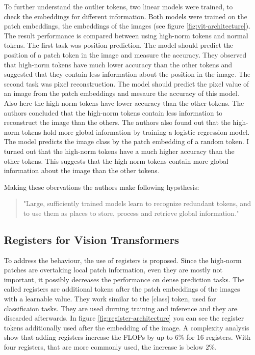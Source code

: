 \documentclass[conference]{IEEEtran}
\begin{document}
  To further understand the outlier tokens, two linear models were trained, to check the embeddings for different information. Both models were trained on the patch embeddings, the embeddings of the images (see figure \ref{fig:vit-architecture}). The result performance is compared between using high-norm tokens and normal tokens. The first task was position prediction. The model should predict the position of a patch token in the image and measure the accuracy. They observed that high-norm tokens have much lower accuracy than the other tokens and suggested that they contain less information about the position in the image. The second task was pixel reconstruction. The model should predict the pixel value of an image from the patch embeddings and mesaure the accuracy of this model. Also here the high-norm tokens have  lower accuracy than the other tokens. The authors concluded that the high-norm tokens contain less information to reconstruct the image than the others. 
  The authors also found out that the high-norm tokens hold more global information by training a logistic regression model. The model predicts the image class by the patch embedding of a random token. I turned out that the high-norm tokens have a much higher accuracy than the other tokens. This suggests that the high-norm tokens contain more global information about the image than the other tokens. 

  Making these obervations the authors make following hypsthesis:
  \begin{quote}
    "Large, sufficiently trained models learn to recognize redundant tokens, and to use them as places to store, process and retrieve global information." \cite{registers}
  \end{quote}

  \subsection{Registers for Vision Transformers}


  To address the behaviour, the use of registers is proposed. Since the high-norm patches are overtaking local patch information, even they are mostly not important, it possibly decreases the performance on dense prediction tasks. The called registers are additional tokens after the patch embeddings of the images with a learnable value. They work similar to the [class] token, used for classificaion tasks. They are used durning training and inference and they are discarded afterwards. In figure \ref{fig:register-architecture} you can see the register tokens additionally used after the embedding of the image. A complexity analysis show that adding registers increase the FLOPs by up to 6\% for 16 registers. With four registers, that are more commonly used, the increase is below 2\%.
\end{document}
